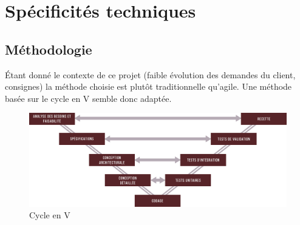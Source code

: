 \section{\textbf{Spécificités techniques}}

	\subsection{\textbf{Méthodologie}}
	Étant donné le contexte de ce projet (faible évolution des demandes du client, consignes) la méthode choisie est plutôt traditionnelle qu'agile. Une méthode basée sur le cycle en V semble donc adaptée. 
	
	\begin{figure}[htbp]
		\caption{\label{fig:CEV} Cycle en V}
		\includegraphics[width=1\textwidth]{CycleEnV.png}
	\end{figure}